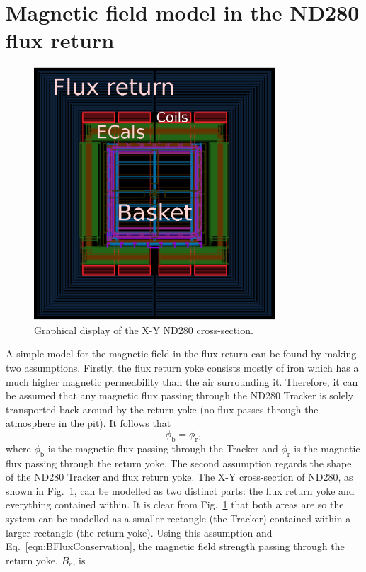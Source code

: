 \section{Magnetic field model in the ND280 flux return}
\label{sec:MagneticFieldModel}
\begin{figure}
  \centering
  \includegraphics[width=9cm]{images/magnetic_field/ND280FluxReturn}
  \caption{Graphical display of the X-Y ND280 cross-section.}
  \label{fig:ND280FluxReturn}
\end{figure}
A simple model for the magnetic field in the flux return can be found by making two assumptions.  Firstly, the flux return yoke consists mostly of iron which has a much higher magnetic permeability than the air surrounding it.  Therefore, it can be assumed that any magnetic flux passing through the ND280 Tracker is solely transported back around by the return yoke (no flux passes through the atmosphere in the pit).  It follows that
\begin{equation}
  \phi_{\textrm{b}} = \phi_{\textrm{r}},
  \label{eqn:BFluxConservation}
\end{equation}
where $\phi_{\textrm{b}}$ is the magnetic flux passing through the Tracker and $\phi_{\textrm{r}}$ is the magnetic flux passing through the return yoke.  The second assumption regards the shape of the ND280 Tracker and flux return yoke.  The X-Y cross-section of ND280, as shown in Fig.~\ref{fig:ND280FluxReturn}, can be modelled as two distinct parts: the flux return yoke and everything contained within.  It is clear from Fig.~\ref{fig:ND280FluxReturn} that both areas are  so the system can be modelled as a smaller rectangle (the Tracker) contained within a larger rectangle (the return yoke).  Using this assumption and Eq.~\ref{eqn:BFluxConservation}, the magnetic field strength passing through the return yoke, $B_{r}$, is
